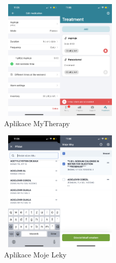 \documentclass[a4paper, 11pt]{article}
\begin{document}
 \begin{figure}[!ht]
		\centering	\includegraphics[width=220,height=220,keepaspectratio]{mytherapy.jpeg}
		\caption{Aplikace MyTherapy}
		\label{figure:mytherapy}
	\end{figure}
 \begin{figure}[!ht]
		\centering
		\includegraphics[width=220,height=220,keepaspectratio]{moje leky.jpeg}
		\caption{Aplikace Moje Leky}
		\label{figure:moje leky}
	\end{figure}
 \FloatBarrier
\end{document}
